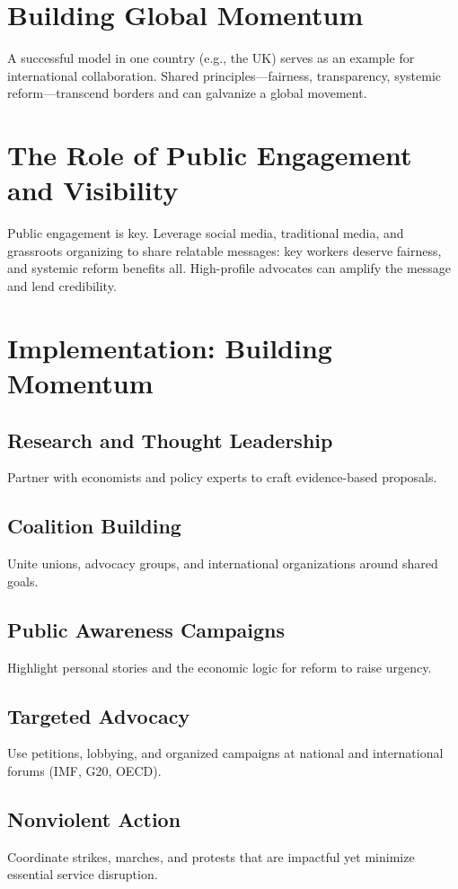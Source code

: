\section{Building Global Momentum}
A successful model in one country (e.g., the UK) serves as an example for international collaboration. Shared principles—fairness, transparency, systemic reform—transcend borders and can galvanize a global movement.

\section{The Role of Public Engagement and Visibility}
Public engagement is key. Leverage social media, traditional media, and grassroots organizing to share relatable messages: key workers deserve fairness, and systemic reform benefits all. High-profile advocates can amplify the message and lend credibility.

\section{Implementation: Building Momentum}
\subsection{Research and Thought Leadership}
Partner with economists and policy experts to craft evidence-based proposals.

\subsection{Coalition Building}
Unite unions, advocacy groups, and international organizations around shared goals.

\subsection{Public Awareness Campaigns}
Highlight personal stories and the economic logic for reform to raise urgency.

\subsection{Targeted Advocacy}
Use petitions, lobbying, and organized campaigns at national and international forums (IMF, G20, OECD).

\subsection{Nonviolent Action}
Coordinate strikes, marches, and protests that are impactful yet minimize essential service disruption.

